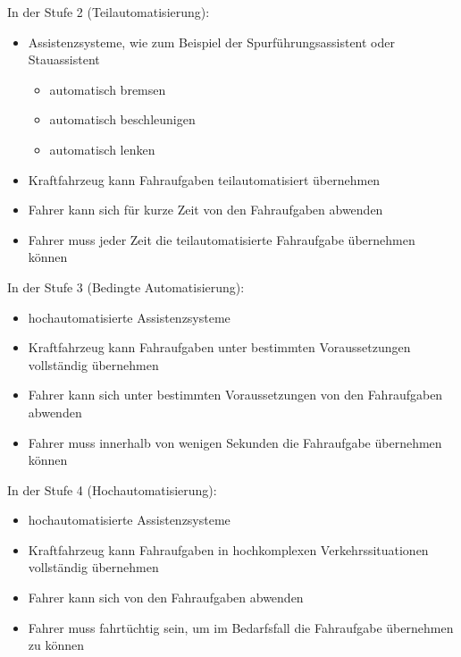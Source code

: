 \vspace{0.5cm}

In der Stufe 2 (Teilautomatisierung):
\begin{itemize}
	\item Assistenzsysteme, wie zum Beispiel der Spurführungsassistent oder Stauassistent
	      \begin{itemize}
		      \item automatisch bremsen
		      \item automatisch beschleunigen
		      \item automatisch lenken
	      \end{itemize}
	\item Kraftfahrzeug kann Fahraufgaben teilautomatisiert übernehmen
	\item Fahrer kann sich für kurze Zeit von den Fahraufgaben abwenden
	\item Fahrer muss jeder Zeit die teilautomatisierte Fahraufgabe übernehmen können
\end{itemize}

\vspace{0.5cm}

In der Stufe 3 (Bedingte Automatisierung):
\begin{itemize}
	\item hochautomatisierte Assistenzsysteme
	\item Kraftfahrzeug kann Fahraufgaben unter bestimmten Voraussetzungen vollständig übernehmen
	\item Fahrer kann sich unter bestimmten Voraussetzungen von den Fahraufgaben abwenden
	\item Fahrer muss innerhalb von wenigen Sekunden die Fahraufgabe übernehmen können
\end{itemize}

\vspace{0.5cm}

In der Stufe 4 (Hochautomatisierung):
\begin{itemize}
	\item hochautomatisierte Assistenzsysteme
	\item Kraftfahrzeug kann Fahraufgaben in hochkomplexen Verkehrssituationen vollständig übernehmen
	\item Fahrer kann sich von den Fahraufgaben abwenden
	\item Fahrer muss fahrtüchtig sein, um im Bedarfsfall die Fahraufgabe übernehmen zu können
\end{itemize}

\vspace{0.5cm}

